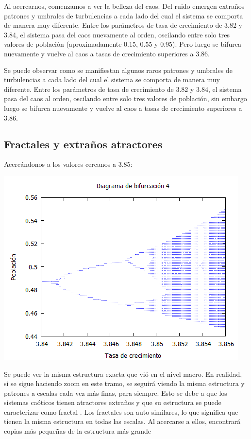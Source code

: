 \documentclass{article}
\begin{document}
Al acercarnos, comenzamos a ver la belleza del caos. Del ruido emergen extraños patrones y umbrales de turbulencias a cada lado del cual el sistema se comporta de manera muy diferente. Entre los parámetros de tasa de crecimiento de 3.82 y 3.84, el sistema pasa del caos nuevamente al orden, oscilando entre solo tres valores de población (aproximadamente 0.15, 0.55 y 0.95). Pero luego se bifurca nuevamente y vuelve al caos a tasas de crecimiento superiores a 3.86.

Se puede observar como se manifiestan algunos raros patrones y umbrales de turbulencias a cada lado del cual el sistema se comporta de manera muy diferente. Entre los parámetros de tasa de crecimiento de 3.82 y 3.84, el sistema pasa del caos  al orden, oscilando entre solo tres valores de población, sin embargo luego se bifurca nuevamente y vuelve al caos a tasas de crecimiento superiores a 3.86.

\subsection{Fractales y extraños atractores}

Acercándonos a los valores cercanos a 3.85:

\begin{center}
\includegraphics[width=.8\textwidth]{Imagen5.PNG}
\end{center}

Se puede ver la misma estructura exacta que vió en el nivel macro. En realidad, si se sigue haciendo zoom en este tramo, se seguirá viendo la misma estructura y patrones a escalas cada vez más finas, para siempre. Esto se debe a que los sistemas caóticos tienen atractores extraños y que su estructura se puede caracterizar como fractal . Los fractales son auto-similares, lo que significa que tienen la misma estructura en todas las escalas. Al acercarse a ellos, encontrará copias más pequeñas de la estructura más grande
\end{document}
